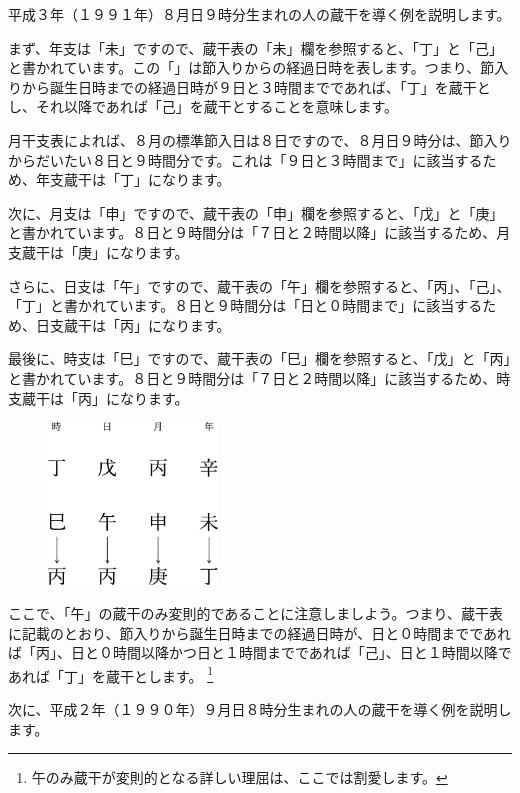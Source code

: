\documentclass[a5paper,11pt,dvipdfmx]{tarticle}
\begin{document}
平成３年（１９９１年）８月日９時分生まれの人の蔵干を導く例を説明します。

まず、年支は「未」ですので、蔵干表の「未」欄を参照すると、「丁」と「己」と書かれています。この「」は節入りからの経過日時を表します。つまり、節入りから誕生日時までの経過日時が９日と３時間までであれば、「丁」を蔵干とし、それ以降であれば「己」を蔵干とすることを意味します。

月干支表によれば、８月の標準節入日は８日ですので、８月日９時分は、節入りからだいたい８日と９時間分です。これは「９日と３時間まで」に該当するため、年支蔵干は「丁」になります。

次に、月支は「申」ですので、蔵干表の「申」欄を参照すると、「戊」と「庚」と書かれています。８日と９時間分は「７日と２時間以降」に該当するため、月支蔵干は「庚」になります。

さらに、日支は「午」ですので、蔵干表の「午」欄を参照すると、「丙」、「己」、「丁」と書かれています。８日と９時間分は「日と０時間まで」に該当するため、日支蔵干は「丙」になります。

最後に、時支は「巳」ですので、蔵干表の「巳」欄を参照すると、「戊」と「丙」と書かれています。８日と９時間分は「７日と２時間以降」に該当するため、時支蔵干は「丙」になります。

\begin{figure}[h]
  \includegraphics[width=45mm,angle=90]{figs/figure3-10.eps}
\end{figure}

ここで、「午」の蔵干のみ変則的であることに注意しましよう。つまり、蔵干表に記載のとおり、節入りから誕生日時までの経過日時が、日と０時間までであれば「丙」、日と０時間以降かつ日と１時間までであれば「己」、日と１時間以降であれば「丁」を蔵干とします。 \footnote{午のみ蔵干が変則的となる詳しい理屈は、ここでは割愛します。}

次に、平成２年（１９９０年）９月日８時分生まれの人の蔵干を導く例を説明します。
\end{document}
